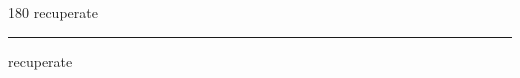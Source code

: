 
\begin{frame}
\begin{center}
\begin{turn}{180}
{\fontsize{2.5cm}{1em}\selectfont recuperate}
\end{turn}
\vspace{1em}\par  
\hrule
\vspace{1em}\par  
{\fontsize{2.5cm}{1em}\selectfont recuperate}
\end{center}
\end{frame}
